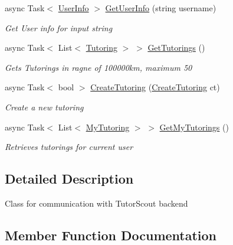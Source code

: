 \begin{DoxyCompactItemize}
async Task$<$ \mbox{\hyperlink{class_tutor_scout24_1_1_models_1_1_user_data_1_1_user_info}{User\+Info}} $>$ \mbox{\hyperlink{class_tutor_scout24_1_1_services_1_1_tutor_scout_rest_service_a0a9cee645967c8be7d723b29778fafae}{Get\+User\+Info}} (string username)
\begin{DoxyCompactList}\small\item\em Get User info for input string \end{DoxyCompactList}\item 
async Task$<$ List$<$ \mbox{\hyperlink{class_tutor_scout24_1_1_models_1_1_tutorings_1_1_tutoring}{Tutoring}} $>$ $>$ \mbox{\hyperlink{class_tutor_scout24_1_1_services_1_1_tutor_scout_rest_service_a6324b2d5d4b9a9fe5dd7592417e8917c}{Get\+Tutorings}} ()
\begin{DoxyCompactList}\small\item\em Gets Tutorings in ragne of 100000km, maximum 50 \end{DoxyCompactList}\item 
async Task$<$ bool $>$ \mbox{\hyperlink{class_tutor_scout24_1_1_services_1_1_tutor_scout_rest_service_a4cd967d7bd8115a9e856964b48ad427d}{Create\+Tutoring}} (\mbox{\hyperlink{class_tutor_scout24_1_1_models_1_1_tutorings_1_1_create_tutoring}{Create\+Tutoring}} ct)
\begin{DoxyCompactList}\small\item\em Create a new tutoring \end{DoxyCompactList}\item 
async Task$<$ List$<$ \mbox{\hyperlink{class_tutor_scout24_1_1_models_1_1_tutorings_1_1_my_tutoring}{My\+Tutoring}} $>$ $>$ \mbox{\hyperlink{class_tutor_scout24_1_1_services_1_1_tutor_scout_rest_service_a5171b947d8edb9279062e9af1f32e41f}{Get\+My\+Tutorings}} ()
\begin{DoxyCompactList}\small\item\em Retrieves tutorings for current user \end{DoxyCompactList}\end{DoxyCompactItemize}


\subsection{Detailed Description}
Class for communication with Tutor\+Scout backend 



\subsection{Member Function Documentation}
\mbox{\label{class_tutor_scout24_1_1_services_1_1_tutor_scout_rest_service_ad896af0129cadfceb66a35932bed7086}} 

